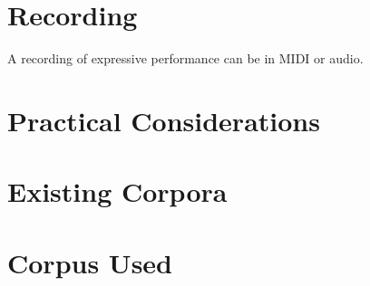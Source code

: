 \section{Recording}
A recording of expressive performance can be in MIDI or audio.

\section{Practical Considerations}

\section{Existing Corpora} 
\section{Corpus Used}

